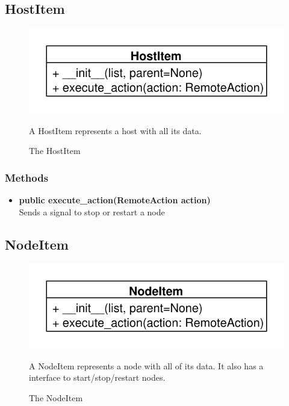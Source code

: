 \newpage
\subsection{HostItem}
\begin{figure}[htbp]
	\begin{minipage}[t]{7cm}
		\vspace{0pt}
		\centering
		\includegraphics[scale=0.6]{./diagram_pictures/HostItem.pdf}
		\caption{The HostItem}
	\end{minipage}
	\hfill
	\begin{minipage}[t]{8cm}
		\vspace{10pt}		
		A HostItem represents a host with all its data.
	\end{minipage}
\end{figure}
\subsubsection{Methods}
\begin{itemize}
  \item \textbf{public execute\_action(RemoteAction action)}\\
  Sends a signal to stop or restart a node
\end{itemize}

\subsection{NodeItem}
\begin{figure}[htbp]
	\begin{minipage}[t]{7cm}
		\vspace{0pt}
		\centering
		\includegraphics[scale=0.6]{./diagram_pictures/NodeItem.pdf}
		\caption{The NodeItem}
	\end{minipage}
	\hfill
	\begin{minipage}[t]{8cm}
		\vspace{10pt}		
		A NodeItem represents a node with all of its data. It also has a interface to
		start/stop/restart nodes.
	\end{minipage}
\end{figure} 
